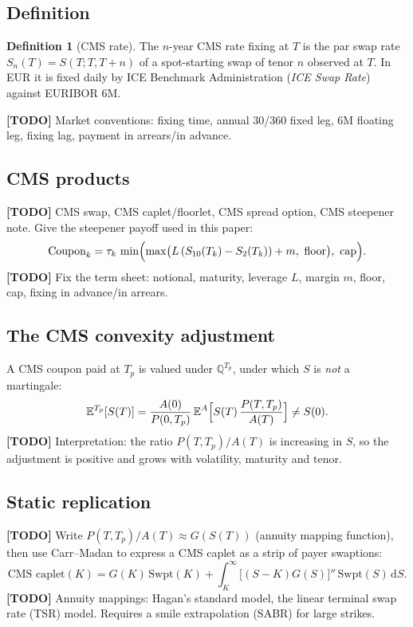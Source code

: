 \documentclass[11pt,a4paper]{article}
\theoremstyle{plain}
\theoremstyle{definition}
\newtheorem{definition}[theorem]{Definition}
\newcommand{\dd}{\mathrm{d}}
\newcommand{\E}{\mathbb{E}}
\newcommand{\Q}{\mathbb{Q}}
\newcommand{\todo}[1]{\textcolor{red!70!black}{\textbf{[TODO]} #1}}
\begin{document}
\subsection{Definition}
\begin{definition}[CMS rate]
The $n$-year CMS rate fixing at $T$ is the par swap rate $S_n(T)=S(T;T,T+n)$ of a spot-starting swap of tenor $n$ observed at $T$. In EUR it is fixed daily by ICE Benchmark Administration (\emph{ICE Swap Rate}) against EURIBOR 6M.
\end{definition}
\todo{Market conventions: fixing time, annual 30/360 fixed leg, 6M floating leg, fixing lag, payment in arrears/in advance.}

\subsection{CMS products}
\todo{CMS swap, CMS caplet/floorlet, CMS spread option, CMS steepener note. Give the steepener payoff used in this paper:}
\begin{equation}
    \text{Coupon}_k = \tau_k\,\min\Bigl(\max\bigl(L\,(S_{10}(T_k)-S_{2}(T_k)) + m,\ \text{floor}\bigr),\ \text{cap}\Bigr).
    \label{eq:steepener}
\end{equation}
\todo{Fix the term sheet: notional, maturity, leverage $L$, margin $m$, floor, cap, fixing in advance/in arrears.}

\subsection{The CMS convexity adjustment}
A CMS coupon paid at $T_p$ is valued under $\Q^{T_p}$, under which $S$ is \emph{not} a martingale:
\begin{equation}
    \E^{T_p}[S(T)] = \frac{A(0)}{P(0,T_p)}\,\E^{A}\Bigl[S(T)\,\frac{P(T,T_p)}{A(T)}\Bigr] \neq S(0).
    \label{eq:cms-convexity}
\end{equation}
\todo{Interpretation: the ratio $P(T,T_p)/A(T)$ is increasing in $S$, so the adjustment is positive and grows with volatility, maturity and tenor.}

\subsection{Static replication}
\todo{Write $P(T,T_p)/A(T)\approx G(S(T))$ (annuity mapping function), then use Carr--Madan to express a CMS caplet as a strip of payer swaptions:}
\begin{equation}
    \text{CMS caplet}(K) = G(K)\,\text{Swpt}(K) + \int_K^\infty \bigl[(S-K)G(S)\bigr]''\,\text{Swpt}(S)\,\dd S .
    \label{eq:replication}
\end{equation}
\todo{Annuity mappings: Hagan's standard model, the linear terminal swap rate (TSR) model. Requires a smile extrapolation (SABR) for large strikes.}
\end{document}
